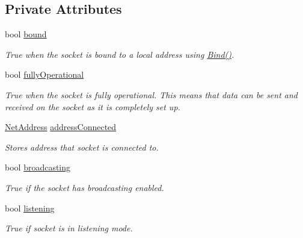 \subsection*{Private Attributes}
\begin{DoxyCompactItemize}
\item 
\hypertarget{class_net_socket_simple_a09e51fe70dc3312db8027e60c2a811e4}{
bool \hyperlink{class_net_socket_simple_a09e51fe70dc3312db8027e60c2a811e4}{bound}}
\label{class_net_socket_simple_a09e51fe70dc3312db8027e60c2a811e4}

\begin{DoxyCompactList}\small\item\em True when the socket is bound to a local address using \hyperlink{class_net_socket_simple_a6d1da3b40e5df6b90571cf1592ca4fa2}{Bind()}. \item\end{DoxyCompactList}\item 
\hypertarget{class_net_socket_simple_afe0c45b11920339fb414dac20e7522c0}{
bool \hyperlink{class_net_socket_simple_afe0c45b11920339fb414dac20e7522c0}{fullyOperational}}
\label{class_net_socket_simple_afe0c45b11920339fb414dac20e7522c0}

\begin{DoxyCompactList}\small\item\em True when the socket is fully operational. This means that data can be sent and received on the socket as it is completely set up. \item\end{DoxyCompactList}\item 
\hypertarget{class_net_socket_simple_a76881498ffe79f92e87515260fe4d44a}{
\hyperlink{class_net_address}{NetAddress} \hyperlink{class_net_socket_simple_a76881498ffe79f92e87515260fe4d44a}{addressConnected}}
\label{class_net_socket_simple_a76881498ffe79f92e87515260fe4d44a}

\begin{DoxyCompactList}\small\item\em Stores address that socket is connected to. \item\end{DoxyCompactList}\item 
bool \hyperlink{class_net_socket_simple_ae423ed3be7d1b07d67dbdf34306bbc72}{broadcasting}
\begin{DoxyCompactList}\small\item\em True if the socket has broadcasting enabled. \item\end{DoxyCompactList}\item 
bool \hyperlink{class_net_socket_simple_ace2f1bd34b944f94a82eb1600a9d9823}{listening}
\begin{DoxyCompactList}\small\item\em True if socket is in listening mode. \item\end{DoxyCompactList}\end{DoxyCompactItemize}



